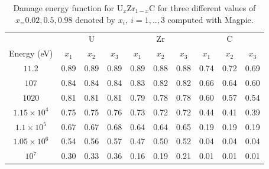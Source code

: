 \documentclass[review]{elsarticle}
\begin{document}
\begin{table}[p]
  \centering
  \caption{Damage energy function for  $\text{U}_x\text{Zr}_{1-x}\text{C}$ for three different values of $x_=0.02, 0.5, 0.98$  denoted by $x_i,~i=1,..,3$ computed with Magpie. \label{tab:UZrC_energy}}
\begin{tabular}{c c c c c c c c c c}
         & \multicolumn{3}{c}{U} & \multicolumn{3}{c}{Zr} & \multicolumn{3}{c}{C} \\
         \cline{2-4} \cline{5-7} \cline{7-10}
Energy (eV)              & $x_1$& $x_2$& $x_3$& $x_1$&$x_2$ &$x_3$ &$x_1$&$x_2$ &$x_3$\\
\hline
   $11.2$ &     0.89 &     0.89 &     0.89 &     0.89 &     0.88 &     0.88 &     0.74 &     0.72 &     0.69 \\
  $107$ &     0.84 &     0.84 &     0.84 &     0.83 &     0.82 &     0.82 &     0.66 &     0.64 &     0.60 \\
 $1020$ &     0.81 &     0.81 &     0.81 &     0.79 &     0.78 &     0.78 &     0.60 &     0.57 &     0.54 \\
$1.15 \times 10^4$ &     0.75 &     0.75 &     0.76 &     0.73 &     0.72 &     0.72 &     0.44 &     0.41 &     0.39 \\
$1.1 \times 10^5$ &     0.67 &     0.67 &     0.68 &     0.64 &     0.64 &     0.65 &     0.19 &     0.19 &     0.19 \\
$1.05 \times 10^6$ &     0.54 &     0.56 &     0.57 &     0.47 &     0.50 &     0.52 &     0.04 &     0.04 &     0.04 \\
$10^7$ &     0.30 &     0.33 &     0.36 &     0.16 &     0.19 &     0.21 &     0.01 &     0.01 &     0.01 \\
\hline
\end{tabular}
\end{table}
\end{document}
